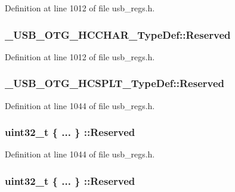 Definition at line 1012 of file usb\-\_\-regs.\-h.

\hypertarget{group___u_s_b___o_t_g___d_r_i_v_e_r_ga9195441c8e492c17349fe9493e41a76a}{
\subsubsection[{Reserved}]{ \-\_\-\-U\-S\-B\-\_\-\-O\-T\-G\-\_\-\-H\-C\-C\-H\-A\-R\-\_\-\-Type\-Def\-::\-Reserved}}\label{group___u_s_b___o_t_g___d_r_i_v_e_r_ga9195441c8e492c17349fe9493e41a76a}


Definition at line 1012 of file usb\-\_\-regs.\-h.

\hypertarget{group___u_s_b___o_t_g___d_r_i_v_e_r_gae2693cd0a5bd810cb890f111e78c0b35}{
\subsubsection[{Reserved}]{ \-\_\-\-U\-S\-B\-\_\-\-O\-T\-G\-\_\-\-H\-C\-S\-P\-L\-T\-\_\-\-Type\-Def\-::\-Reserved}}\label{group___u_s_b___o_t_g___d_r_i_v_e_r_gae2693cd0a5bd810cb890f111e78c0b35}


Definition at line 1044 of file usb\-\_\-regs.\-h.

\hypertarget{group___u_s_b___o_t_g___d_r_i_v_e_r_gaa7e466ac59bdd2acfdbf8e4394274cdf}{
\subsubsection[{Reserved}]{\setlength{\rightskip}{0pt plus 5cm}uint32\-\_\-t \{ ... \} \-::Reserved}}\label{group___u_s_b___o_t_g___d_r_i_v_e_r_gaa7e466ac59bdd2acfdbf8e4394274cdf}


Definition at line 1044 of file usb\-\_\-regs.\-h.

\hypertarget{group___u_s_b___o_t_g___d_r_i_v_e_r_ga01ba1ad97bde94fb817ee1300f2970e1}{
\subsubsection[{Reserved}]{\setlength{\rightskip}{0pt plus 5cm}uint32\-\_\-t \{ ... \} \-::Reserved}}\label{group___u_s_b___o_t_g___d_r_i_v_e_r_ga01ba1ad97bde94fb817ee1300f2970e1}


